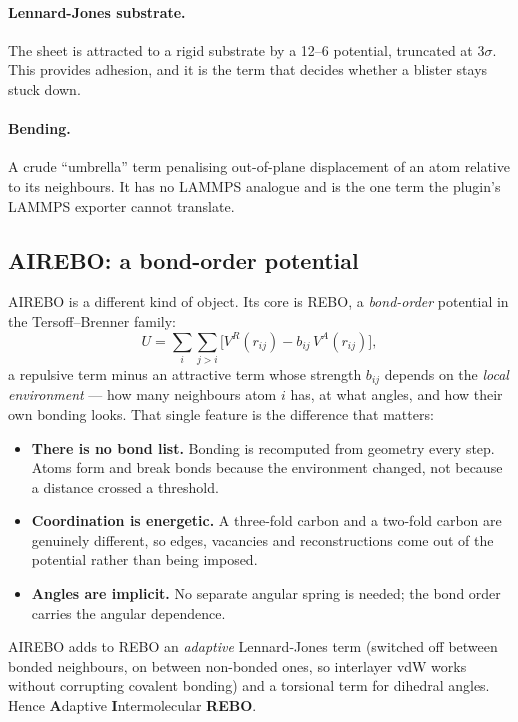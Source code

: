 \documentclass[11pt,a4paper]{article}
\begin{document}
\paragraph{Lennard-Jones substrate.} The sheet is attracted to a rigid
substrate by a 12--6 potential, truncated at $3\sigma$. This provides adhesion,
and it is the term that decides whether a blister stays stuck down.

\paragraph{Bending.} A crude ``umbrella'' term penalising out-of-plane
displacement of an atom relative to its neighbours. It has no LAMMPS analogue
and is the one term the plugin's LAMMPS exporter cannot translate.

\subsection{AIREBO: a bond-order potential}

AIREBO is a different kind of object. Its core is REBO, a \emph{bond-order}
potential in the Tersoff--Brenner family:
\begin{equation}
U = \sum_{i}\sum_{j>i}\Big[ V^{R}(r_{ij}) - b_{ij}\,V^{A}(r_{ij}) \Big],
\end{equation}
a repulsive term minus an attractive term whose strength $b_{ij}$ depends on
the \emph{local environment} --- how many neighbours atom $i$ has, at what
angles, and how their own bonding looks. That single feature is the difference
that matters:

\begin{itemize}
\item \textbf{There is no bond list.} Bonding is recomputed from geometry every
      step. Atoms form and break bonds because the environment changed, not
      because a distance crossed a threshold.
\item \textbf{Coordination is energetic.} A three-fold carbon and a two-fold
      carbon are genuinely different, so edges, vacancies and reconstructions
      come out of the potential rather than being imposed.
\item \textbf{Angles are implicit.} No separate angular spring is needed; the
      bond order carries the angular dependence.
\end{itemize}

AIREBO adds to REBO an \emph{adaptive} Lennard-Jones term (switched off between
bonded neighbours, on between non-bonded ones, so interlayer vdW works without
corrupting covalent bonding) and a torsional term for dihedral angles. Hence
\textbf{A}daptive \textbf{I}ntermolecular \textbf{REBO}.
\end{document}

